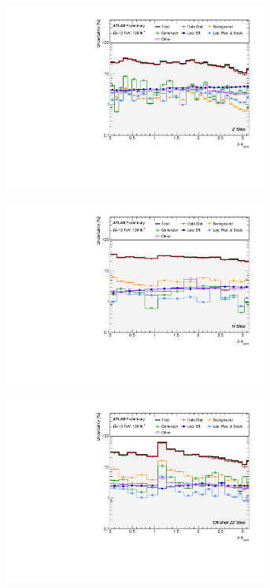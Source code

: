 \begin{figure}[hp]
    \centering
    \begin{subfigure}{.49\textwidth}\centering\includegraphics[width = 0.95\textwidth]{Figures/m4l/Systematics/Unfolded/UnfoldedSys_dPhiPairs_vs_M4l_Stack_Paper0.pdf}\end{subfigure}
    \begin{subfigure}{.49\textwidth}\centering\includegraphics[width = 0.95\textwidth]{Figures/m4l/Systematics/Unfolded/UnfoldedSys_dPhiPairs_vs_M4l_Stack_Paper1.pdf}\end{subfigure}
    \begin{subfigure}{.49\textwidth}\centering\includegraphics[width = 0.95\textwidth]{Figures/m4l/Systematics/Unfolded/UnfoldedSys_dPhiPairs_vs_M4l_Stack_Paper2.pdf}\end{subfigure}

\end{figure}
